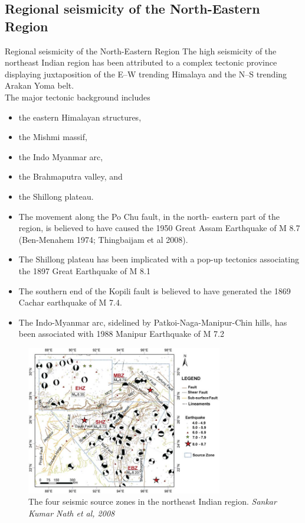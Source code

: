 \documentclass[smaller]{beamer}
\begin{document}
\subsection{Regional  seismicity of the North-Eastern Region}
\begin{frame}{Regional  seismicity of the North-Eastern Region}
The high seismicity of the northeast Indian region
has been attributed to a complex tectonic province
displaying juxtaposition of the E–W trending
Himalaya and the N–S trending Arakan Yoma
belt.\\
The major tectonic background includes 
\begin{itemize}
\item the
eastern Himalayan structures, 
\item the Mishmi massif,
\item the Indo Myanmar arc, 
\item the Brahmaputra valley,
and \item the Shillong plateau.
\end{itemize}
\end{frame}
\begin{frame}
\begin{itemize}
\item The movement along the Po Chu fault, in the north- eastern part of the region, is believed to have caused the 1950 Great Assam Earthquake of M 8.7 (Ben-Menahem 1974; Thingbaijam et al 2008).

\item 	The Shillong plateau has been implicated with a pop-up tectonics associating the 1897 Great Earthquake of M 8.1


\item 	The southern end of the Kopili fault is believed to have generated the 1869 Cachar earthquake of M 7.4.


\item 	The Indo-Myanmar arc, sidelined by Patkoi-Naga-Manipur-Chin hills, has been associated with 1988 Manipur Earthquake of M 7.2

\end{itemize}
\end{frame}
\begin{frame}
\begin{figure}
\includegraphics[height=6.5cm]{ne.png}
\caption{The four seismic source zones in the northeast Indian region. \textsl{Sankar Kumar Nath et al, 2008}}
\end{figure}
\end{frame}
\end{document}
